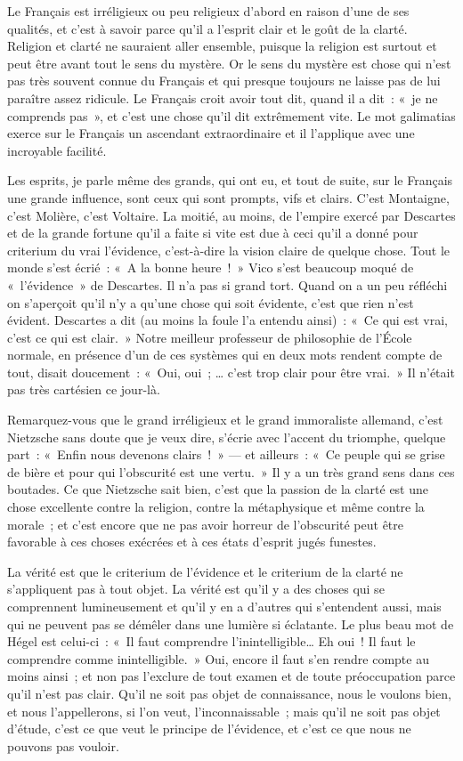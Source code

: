 \documentclass[french,twoside]{book} %
\begin{document}
\noindent Le Français est irréligieux ou peu religieux d’abord en raison d’une de ses qualités, et c’est à savoir parce qu’il a l’esprit clair et le goût de la clarté. Religion et clarté ne sauraient aller ensemble, puisque la religion est surtout et peut être avant tout le sens du mystère. Or le sens du mystère est chose qui n’est pas très souvent connue du Français et qui presque toujours ne laisse pas de lui paraître assez ridicule. Le Français croit avoir tout dit, quand il a dit : « je ne comprends pas », et c’est une chose qu’il dit extrêmement vite. Le mot galimatias exerce sur le Français un ascendant extraordinaire et il l’applique avec une incroyable facilité.\par
Les esprits, je parle même des grands, qui ont eu, et tout de suite, sur le Français une grande influence, sont ceux qui sont prompts, vifs et clairs. C’est Montaigne, c’est Molière, c’est Voltaire. La moitié, au moins, de l’empire exercé par Descartes et de la grande fortune qu’il a faite si vite est due à ceci qu’il a donné pour criterium du vrai l’évidence, c’est-à-dire la vision claire de quelque  chose. Tout le monde s’est écrié : « A la bonne heure ! » Vico s’est beaucoup moqué de « l’évidence » de Descartes. Il n’a pas si grand tort. Quand on a un peu réfléchi on s’aperçoit qu’il n’y a qu’une chose qui soit évidente, c’est que rien n’est évident. Descartes a dit (au moins la foule l’a entendu ainsi) : « Ce qui est vrai, c’est ce qui est clair. » Notre meilleur professeur de philosophie de l’École normale, en présence d’un de ces systèmes qui en deux mots rendent compte de tout, disait doucement : « Oui, oui ; … c’est trop clair pour être vrai. » Il n’était pas très cartésien ce jour-là.\par
Remarquez-vous que le grand irréligieux et le grand immoraliste allemand, c’est Nietzsche sans doute que je veux dire, s’écrie avec l’accent du triomphe, quelque part : « Enfin nous devenons clairs ! » — et ailleurs : « Ce peuple qui se grise de bière et pour qui l’obscurité est une vertu. » Il y a un très grand sens dans ces boutades. Ce que Nietzsche sait bien, c’est que la passion de la clarté est une chose excellente contre la religion, contre la métaphysique et même contre la morale ; et c’est encore que ne pas avoir horreur de l’obscurité peut être favorable à ces choses exécrées et à ces états d’esprit jugés funestes.\par
La vérité est que le criterium de l’évidence et  le criterium de la clarté ne s’appliquent pas à tout objet. La vérité est qu’il y a des choses qui se comprennent lumineusement et qu’il y en a d’autres qui s’entendent aussi, mais qui ne peuvent pas se démêler dans une lumière si éclatante. Le plus beau mot de Hégel est celui-ci : « Il faut comprendre l’inintelligible… Eh oui ! Il faut le comprendre comme inintelligible. » Oui, encore il faut s’en rendre compte au moins ainsi ; et non pas l’exclure de tout examen et de toute préoccupation parce qu’il n’est pas clair. Qu’il ne soit pas objet de connaissance, nous le voulons bien, et nous l’appellerons, si l’on veut, l’inconnaissable ; mais qu’il ne soit pas objet d’étude, c’est ce que veut le principe de l’évidence, et c’est ce que nous ne pouvons pas vouloir.\par
\end{document}
